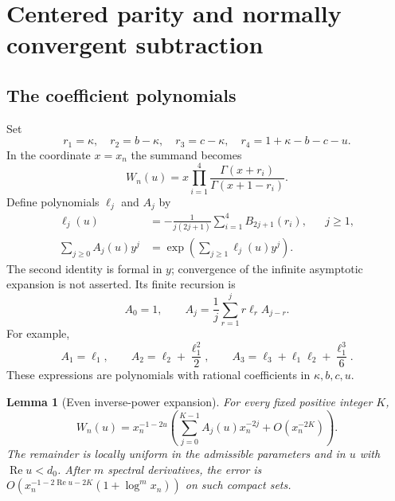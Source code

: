 \documentclass[11pt,letterpaper]{article}
\numberwithin{equation}{section}
\newtheorem{lemma}[theorem]{Lemma}
\theoremstyle{definition}
\theoremstyle{remark}
\DeclareMathOperator{\Rea}{Re}
\begin{document}
\section{Centered parity and normally convergent subtraction}
\label{dr:sec:subtraction}

\subsection{The coefficient polynomials}

Set
\begin{equation}
 r_1=\kappa,\quad r_2=b-\kappa,\quad r_3=c-\kappa,
 \quad r_4=1+\kappa-b-c-u.
 \label{dr:eq:r}
\end{equation}
In the coordinate $x=x_n$ the summand becomes
\begin{equation}
 W_n(u)=x\prod_{i=1}^4
           \frac{\Gamma(x+r_i)}{\Gamma(x+1-r_i)}.
 \label{dr:eq:centered}
\end{equation}
Define polynomials $\ell_j$ and $A_j$ by
\begin{align}
 \ell_j(u)&=-\frac1{j(2j+1)}\sum_{i=1}^4B_{2j+1}(r_i),
       &&j\geq1,\label{dr:eq:ell}\\
 \sum_{j\geq0}A_j(u)y^j
   &=\exp\!\left(\sum_{j\geq1}\ell_j(u)y^j\right).
       \label{dr:eq:A}
\end{align}
The second identity is formal in $y$; convergence of the infinite
asymptotic expansion is not asserted. Its finite recursion is
\begin{equation}
 A_0=1,\qquad A_j=\frac1j\sum_{r=1}^j r\ell_r A_{j-r}.
 \label{dr:eq:recursion}
\end{equation}
For example,
\begin{equation}
 A_1=\ell_1,\qquad A_2=\ell_2+\frac{\ell_1^2}{2},\qquad
 A_3=\ell_3+\ell_1\ell_2+\frac{\ell_1^3}{6}.
 \label{dr:eq:first-A}
\end{equation}
These expressions are polynomials with rational coefficients in
$\kappa,b,c,u$.

\begin{lemma}[Even inverse-power expansion]
\label{dr:lem:parity}
For every fixed positive integer $K$,
\begin{equation}
 W_n(u)=x_n^{-1-2u}
 \left(\sum_{j=0}^{K-1}A_j(u)x_n^{-2j}
             +O(x_n^{-2K})\right).
 \label{dr:eq:asymptotic}
\end{equation}
The remainder is locally uniform in the admissible parameters and in
$u$ with $\Rea u<d_0$. After $m$ spectral derivatives, the error is
$O(x_n^{-1-2\Rea u-2K}(1+\log^m x_n))$ on such compact sets.
\end{lemma}
\end{document}
